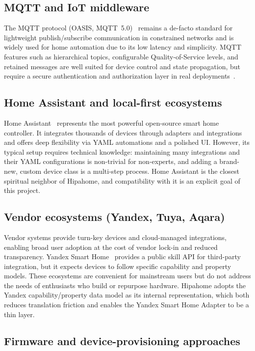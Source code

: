 \documentclass[a4paper,12pt]{article}
\begin{document}
\subsection{MQTT and IoT middleware}

The MQTT protocol (OASIS, MQTT~5.0)~\cite{oasis-mqtt5} remains a de-facto standard for lightweight publish/subscribe communication in constrained networks and is widely used for home automation due to its low latency and simplicity. MQTT features such as hierarchical topics, configurable Quality-of-Service levels, and retained messages are well suited for device control and state propagation, but require a secure authentication and authorization layer in real deployments~\cite{oasis-mqtt5}.

\subsection{Home Assistant and local-first ecosystems}

Home Assistant~\cite{home-assistant} represents the most powerful open-source smart home controller. It integrates thousands of devices through adapters and integrations and offers deep flexibility via YAML automations and a polished UI. However, its typical setup requires technical knowledge: maintaining many integrations and their YAML configurations is non-trivial for non-experts, and adding a brand-new, custom device class is a multi-step process. Home Assistant is the closest spiritual neighbor of Hipahome, and compatibility with it is an explicit goal of this project.

\subsection{Vendor ecosystems (Yandex, Tuya, Aqara)}

Vendor systems provide turn-key devices and cloud-managed integrations, enabling broad user adoption at the cost of vendor lock-in and reduced transparency. Yandex Smart Home~\cite{yandex-sh-api} provides a public skill API for third-party integration, but it expects devices to follow specific capability and property models. These ecosystems are convenient for mainstream users but do not address the needs of enthusiasts who build or repurpose hardware. Hipahome adopts the Yandex capability/property data model as its internal representation, which both reduces translation friction and enables the Yandex Smart Home Adapter to be a thin layer.

\subsection{Firmware and device-provisioning approaches}
\end{document}
